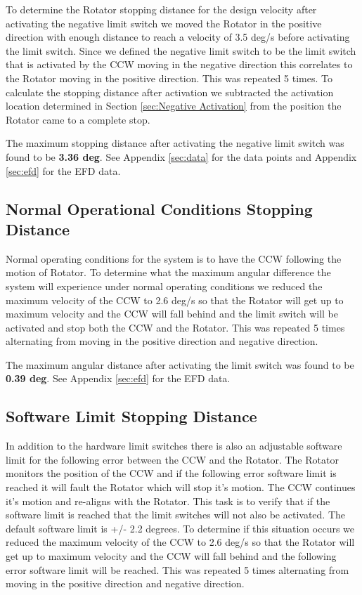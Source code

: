 \documentclass[SE,authoryear,toc, lsstdraft]{lsstdoc}
\begin{document}
To determine the Rotator stopping distance for the design velocity after
activating the negative limit switch we moved the Rotator in the
positive direction with enough distance to reach a velocity of 3.5 deg/s
before activating the limit switch. Since we defined the negative limit
switch to be the limit switch that is activated by the CCW moving in the
negative direction this correlates to the Rotator moving in the positive
direction. This was repeated 5 times. To calculate the stopping
distance after activation we subtracted the activation location
determined in Section \ref{sec:Negative Activation} from the position the Rotator came to a
complete stop.

The maximum stopping distance after activating the negative limit switch
was found to be \textbf{3.36 deg}. See Appendix \ref{sec:data} for the data points
and Appendix \ref{sec:efd} for the EFD data.

\subsection{Normal Operational Conditions Stopping Distance}

Normal operating conditions for the system is to have the CCW following the motion of Rotator.
To determine what the maximum angular difference the system will experience under
normal operating conditions we reduced the maximum velocity of the CCW to 2.6 deg/s so that the Rotator
will get up to maximum velocity and the CCW will fall behind and the limit switch will be activated
and stop both the CCW and the Rotator. This was repeated 5 times alternating from moving in the
positive direction and negative direction.

The maximum angular distance after activating the limit switch
was found to be \textbf{0.39 deg}. See Appendix \ref{sec:efd} for the EFD data.

\subsection{Software Limit Stopping Distance}

In addition to the hardware limit switches there is also an adjustable software limit for the
following error between the CCW and the Rotator. The Rotator monitors the position of the CCW
and if the following error software limit is reached it will fault the Rotator which will stop it's motion.
The CCW continues it's motion and re-aligns with the Rotator. This task is to verify that if the software
limit is reached that the limit switches will not also be activated. The default software limit is +/- 2.2 degrees.
To determine if this situation occurs we reduced the maximum velocity of the CCW to 2.6 deg/s so that
the Rotator will get up to maximum velocity and the CCW will fall behind and the following error software
limit will be reached. This was repeated 5 times alternating from moving in the positive direction
and negative direction.
\end{document}
